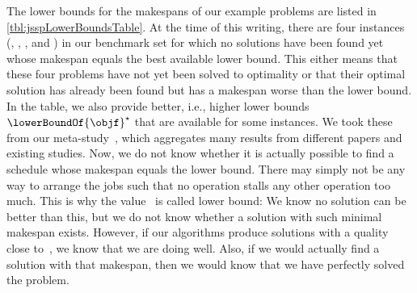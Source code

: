 The lower bounds for the makespans of our example problems are listed in \autoref{tbl:jsspLowerBoundsTable}.
At the time of this writing, there are four instances (, , , and ) in our benchmark set for which no solutions have been found yet whose makespan equals the best available lower bound.
This either means that these four problems have not yet been solved to optimality or that their optimal solution has already been found but has a makespan worse than the lower bound.
In the table, we also provide better, i.e., higher lower bounds~$\lowerBoundOf{\objf}^{\star}$ that are available for some instances.
We took these from our meta-study~\cite{W2019JRDAIOTJSSP}, which aggregates many results from different papers and existing studies.
%
\endhsection%
%
%
Now, we do not know whether it is actually possible to find a schedule whose makespan equals the lower bound.
There may simply not be any way to arrange the jobs such that no operation stalls any other operation too much.
This is why the value~\lowerBoundOf{\objf} is called lower bound:
We know no solution can be better than this, but we do not know whether a solution with such minimal makespan exists.
However, if our algorithms produce solutions with a quality close to~\lowerBoundOf{\objf}, we know that we are doing well.
Also, if we would actually find a solution with that makespan, then we would know that we have perfectly solved the problem.
\endhsection%
\endhsection%
%

